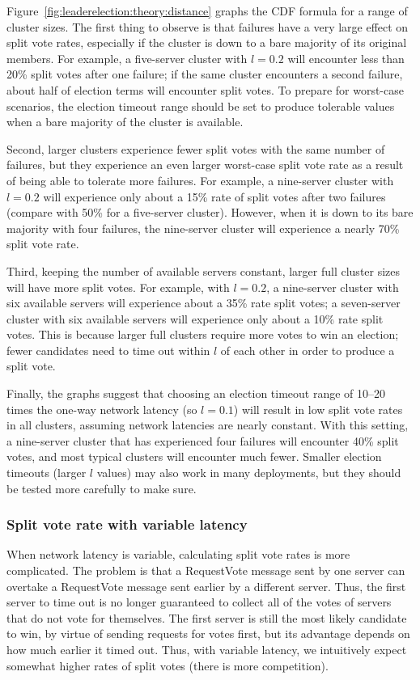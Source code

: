 Figure~\ref{fig:leaderelection:theory:distance} graphs the CDF formula for
a range of cluster sizes. The first thing to observe is that failures
have a very large effect on split vote rates, especially if the cluster
is down to a bare majority of its original members. For example, a
five-server cluster
with $l=0.2$ will encounter less than 20\% split votes after one
failure;
if the same cluster encounters a second failure, about half of election
terms will encounter split votes. To prepare for worst-case scenarios,
the election timeout range should be set to produce tolerable values
when a bare majority of the cluster is available.

Second,
larger clusters experience fewer split votes with the same number of
failures, but they experience an even larger worst-case split vote rate
as a result of being able to tolerate more failures. For example, a
nine-server cluster with $l=0.2$ will experience only about a
15\% rate of
split votes after two failures (compare with 50\% for a five-server
cluster). However, when it is down to its bare majority with four
failures, the nine-server cluster will experience a nearly 70\% split vote rate.

Third, keeping the number of available servers constant, larger full
cluster sizes will have more split votes. For example, with $l=0.2$, a
nine-server cluster with six available servers will experience about a
35\% rate split votes; a seven-server cluster with six available servers will
experience only about a 10\% rate split votes. This is because larger full
clusters require more votes to win an election; fewer candidates need to
time out within $l$ of each other in order to produce a split vote.

Finally, the graphs suggest that choosing an election timeout range of
10--20 times the one-way network latency (so $l=0.1$) will result in low split
vote rates in all clusters, assuming network latencies are nearly
constant. With this setting, a nine-server cluster that has experienced
four failures will encounter 40\% split votes, and most typical clusters
will encounter much fewer. Smaller election timeouts (larger $l$ values)
may also work in many deployments, but they should be tested more
carefully to make sure.

\subsubsection{Split vote rate with variable latency}

When network latency is variable, calculating split vote rates is more
complicated. The problem is that a RequestVote message sent by one
server can overtake a RequestVote message sent earlier by a different
server. Thus, the first server to time out is no longer guaranteed to
collect all of the votes of servers that do not vote for themselves.
The first server is still the most likely candidate to win, by virtue of
sending requests for votes first, but its advantage depends on how much
earlier it timed out. Thus, with variable latency, we intuitively expect
somewhat higher rates of split votes (there is more competition).

